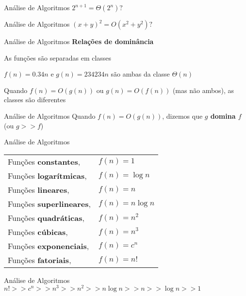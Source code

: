 \documentclass[10pt]{beamer}
\begin{document}
\begin{frame}{Análise de Algoritmos}
  \huge
  \centering
  $2^{n + 1} = \Theta(2^n)?$
\end{frame}

\begin{frame}{Análise de Algoritmos}
  \huge
  \centering
  $(x + y)^2 = O(x^2 + y^2)?$
\end{frame}

\begin{frame}{Análise de Algoritmos}
  \huge \textbf{Relações de dominância}

  \vfill

  \Large As funções são separadas em classes

  \bigskip

  $ f(n) = 0.34 n$ e $g(n) = 234234 n$ são ambas da classe $\Theta(n)$

  \bigskip

  Quando $f(n) = O(g(n))$ ou $g(n) = O(f(n))$ (mas não ambos), as classes são diferentes
\end{frame}

\begin{frame}{Análise de Algoritmos}
  \huge Quando $f(n) = O(g(n))$, dizemos que \textbf{$g$ domina $f$} (ou $g >> f$)
\end{frame}

\begin{frame}{Análise de Algoritmos}
  \Large
  \begin{tabular}{ll}
    Funções \textbf{constantes}, & $f(n) = 1$ \\
    Funções \textbf{logarítmicas}, & $f(n) = \log{n}$ \\
    Funções \textbf{lineares}, & $f(n) = n$ \\
    Funções \textbf{superlineares}, & $f(n) = n \log{n}$ \\
    Funções \textbf{quadráticas}, & $f(n) = n^2$ \\
    Funções \textbf{cúbicas}, & $f(n) = n^3$ \\
    Funções \textbf{exponenciais}, & $f(n) = c^n$ \\
    Funções \textbf{fatoriais}, & $f(n) = n!$
  \end{tabular}
\end{frame}

\begin{frame}{Análise de Algoritmos}
  \large
  \centering
  $n! >> c^n >> n^3 >> n^2 >> n \log{n} >> n >> \log{n} >> 1$
\end{frame}
\end{document}
